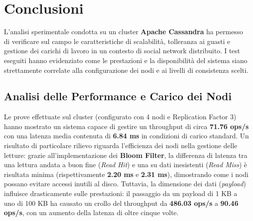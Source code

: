 \documentclass[12pt]{article}
\begin{document}
\section{Conclusioni} \label{s_conclusioni}

L'analisi sperimentale condotta su un cluster \textbf{Apache Cassandra} ha permesso di verificare sul campo le caratteristiche di scalabilità, tolleranza ai guasti e gestione dei carichi di lavoro in un contesto di social network distribuito. I test eseguiti hanno evidenziato come le prestazioni e la disponibilità del sistema siano strettamente correlate alla configurazione dei nodi e ai livelli di consistenza scelti.

\subsection{Analisi delle Performance e Carico dei Nodi}
Le prove effettuate sul cluster (configurato con 4 nodi e Replication Factor 3) hanno mostrato un sistema capace di gestire un throughput di circa \textbf{71.76 ops/s} con una latenza media contenuta di \textbf{6.84 ms} in condizioni di carico standard.\newline\newline
\noindent
Un risultato di particolare rilievo riguarda l'efficienza dei nodi nella gestione delle letture: grazie all'implementazione dei \textbf{Bloom Filter}, la differenza di latenza tra una lettura andata a buon fine (\textit{Read Hit}) e una su dati inesistenti (\textit{Read Miss}) è risultata minima (rispettivamente \textbf{2.20 ms} e \textbf{2.31 ms}), dimostrando come i nodi possano evitare accessi inutili al disco. Tuttavia, la dimensione dei dati (\textit{payload}) influisce drasticamente sulle prestazioni: il passaggio da un payload di 1 KB a uno di 100 KB ha causato un crollo del throughput da \textbf{486.03 ops/s} a \textbf{90.46 ops/s}, con un aumento della latenza di oltre cinque volte.
\end{document}
